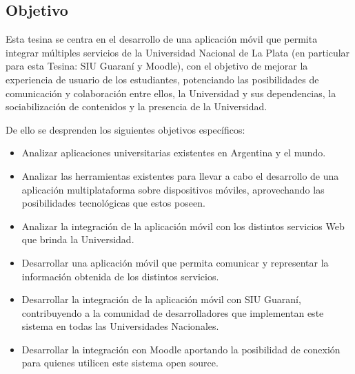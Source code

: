 \subsection{Objetivo}
\label{objetivo}

Esta tesina se centra en el desarrollo de una aplicación móvil que permita
integrar múltiples servicios de la Universidad Nacional de La Plata (en
particular para esta Tesina: SIU Guaraní y Moodle), con el objetivo de mejorar
la experiencia de usuario de los estudiantes, potenciando las posibilidades de
comunicación y colaboración entre ellos, la Universidad y sus dependencias, la
sociabilización de contenidos y la presencia de la Universidad.

De ello se desprenden los siguientes objetivos específicos:

\begin{itemize}
  \item Analizar aplicaciones universitarias existentes en Argentina y el mundo.

  \item Analizar las herramientas existentes para llevar a cabo el desarrollo
  de una aplicación multiplataforma sobre dispositivos móviles, aprovechando las
  posibilidades tecnológicas que estos poseen.

  \item Analizar la integración de la aplicación móvil con los distintos
  servicios Web que brinda la Universidad.

  \item Desarrollar una aplicación móvil que permita comunicar y representar la
  información obtenida de los distintos servicios.

  \item Desarrollar la integración de la aplicación móvil con SIU Guaraní,
  contribuyendo a la comunidad de desarrolladores que implementan este sistema en todas las Universidades Nacionales.

  \item Desarrollar la integración con Moodle aportando la posibilidad de
  conexión para quienes utilicen este sistema open source.
\end{itemize}
